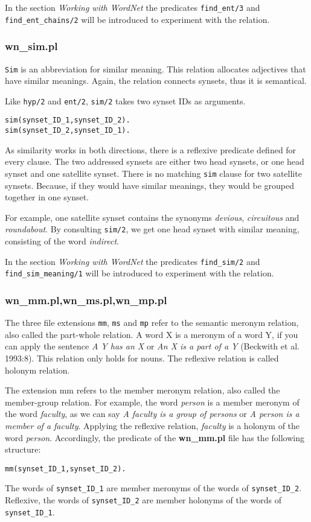 \documentclass[12pt]{article}
\begin{document}
In the section \emph{Working with WordNet} the predicates {\tt find\_ent/3} and {\tt find\_ent\_chains/2} will be introduced to
experiment with the relation.

\subsubsection{wn\_sim.pl}

{\tt Sim} is an abbreviation for similar meaning. This relation allocates adjectives that have similar meanings. Again,
the relation connects synsets, thus it is semantical.

Like {\tt hyp/2} and {\tt ent/2}, {\tt sim/2} takes two synset IDs as arguments.
\begin{verbatim}
sim(synset_ID_1,synset_ID_2).
sim(synset_ID_2,synset_ID_1).
\end{verbatim}
As similarity works in both directions, there is a reflexive predicate defined for every clause.
The two addressed synsets are either two head synsets, or one head synset and one satellite synset.
There is no matching {\tt sim} clause for two satellite synsets. Because, if they would have similar meanings, they
would be grouped together in one synset.

For example, one satellite synset contains the synonyms \emph{devious}, \emph{circuitous} and \emph{roundabout}.
By consulting {\tt sim/2}, we get one head synset with similar meaning, consisting of the word \emph{indirect}.

In the section \emph{Working with WordNet} the predicates {\tt find\_sim/2} and {\tt find\_sim\_meaning/1} will be introduced to
experiment with the relation.

\subsubsection{wn\_mm.pl,wn\_ms.pl,wn\_mp.pl}

The three file extensions {\tt mm}, {\tt ms} and {\tt mp} refer to
the semantic meronym relation, also called the part-whole
relation. A word X is a meronym of a word Y, if  you can apply the
sentence \emph{A Y has an X} or \emph{An X is a part of a Y}
(Beckwith et al. 1993:8). This relation only holds for nouns. The
reflexive relation is called holonym relation.

The extension mm refers to the member meronym relation, also called the member-group relation.
For example, the word \emph{person} is a member
meronym of the word \emph{faculty}, as we can say \emph{A faculty is a group of persons}
or \emph{A person is a member of a faculty}.
Applying the reflexive relation, \emph{faculty} is a holonym of the word \emph{person}.
Accordingly, the predicate of the {\bfseries wn\_mm.pl} file has the following structure:
\begin{verbatim}
mm(synset_ID_1,synset_ID_2).
\end{verbatim}
The words of {\tt synset\_ID\_1} are member meronyms of the words of {\tt synset\_ID\_2}.
Reflexive, the words of {\tt synset\_ID\_2} are member holonyms of the words of {\tt synset\_ID\_1}.
\end{document}
